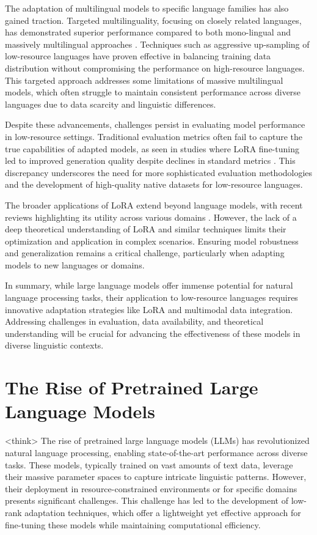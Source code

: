 \documentclass[conference]{IEEEtran}
\begin{document}
The adaptation of multilingual models to specific language families has also gained traction. Targeted multilinguality, focusing on closely related languages, has demonstrated superior performance compared to both mono-lingual and massively multilingual approaches \cite{b4}. Techniques such as aggressive up-sampling of low-resource languages have proven effective in balancing training data distribution without compromising the performance on high-resource languages. This targeted approach addresses some limitations of massive multilingual models, which often struggle to maintain consistent performance across diverse languages due to data scarcity and linguistic differences.

Despite these advancements, challenges persist in evaluating model performance in low-resource settings. Traditional evaluation metrics often fail to capture the true capabilities of adapted models, as seen in studies where LoRA fine-tuning led to improved generation quality despite declines in standard metrics \cite{b5}. This discrepancy underscores the need for more sophisticated evaluation methodologies and the development of high-quality native datasets for low-resource languages.

The broader applications of LoRA extend beyond language models, with recent reviews highlighting its utility across various domains \cite{b6}. However, the lack of a deep theoretical understanding of LoRA and similar techniques limits their optimization and application in complex scenarios. Ensuring model robustness and generalization remains a critical challenge, particularly when adapting models to new languages or domains.

In summary, while large language models offer immense potential for natural language processing tasks, their application to low-resource languages requires innovative adaptation strategies like LoRA and multimodal data integration. Addressing challenges in evaluation, data availability, and theoretical understanding will be crucial for advancing the effectiveness of these models in diverse linguistic contexts.

\section{The Rise of Pretrained Large Language Models}
<think>
The rise of pretrained large language models (LLMs) has revolutionized natural language processing, enabling state-of-the-art performance across diverse tasks. These models, typically trained on vast amounts of text data, leverage their massive parameter spaces to capture intricate linguistic patterns. However, their deployment in resource-constrained environments or for specific domains presents significant challenges. This challenge has led to the development of low-rank adaptation techniques, which offer a lightweight yet effective approach for fine-tuning these models while maintaining computational efficiency.
\end{document}
